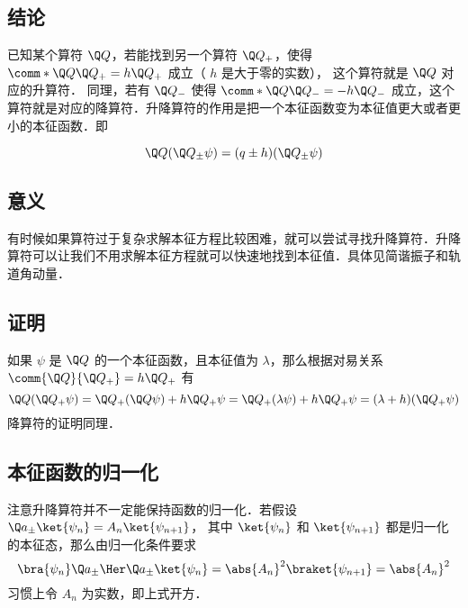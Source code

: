 


\subsection{结论}

已知某个算符 $\Q Q$，若能找到另一个算符 $\Q Q_+$，使得 $\comm*{\Q Q}{\Q Q_+} = h \Q Q_+$ 成立（ $h$ 是大于零的实数）， 这个算符就是 $\Q Q$ 对应的升算符． 同理，若有 $\Q Q_-$ 使得 $\comm*{\Q Q}{\Q Q_-} = - h\Q Q_-$ 成立，这个算符就是对应的降算符．升降算符的作用是把一个本征函数变为本征值更大或者更小的本征函数．即

\begin{equation}\label{RLop_eq1}
\Q Q(\Q Q_\pm\psi) = (q \pm h) (\Q Q_ \pm\psi)
\end{equation}

\subsection{意义}
有时候如果算符过于复杂求解本征方程比较困难，就可以尝试寻找升降算符．升降算符可以让我们不用求解本征方程就可以快速地找到本征值．具体见简谐振子和轨道角动量．%

\subsection{证明}
如果 $\psi$ 是 $\Q Q$ 的一个本征函数，且本征值为 $\lambda$，那么根据对易关系 $\comm{\Q Q}{\Q Q_+} = h \Q Q_+$ 有
\begin{equation}
\Q Q (\Q Q_+ \psi) = \Q Q_+ (\Q Q\psi) + h \Q Q_+ \psi  = \Q Q_+ (\lambda \psi) + h \Q Q_+ \psi  = (\lambda  + h)(\Q Q_+ \psi)
\end{equation}
降算符的证明同理．

\subsection{本征函数的归一化}
注意升降算符并不一定能保持函数的归一化．若假设 $\Q a_\pm \ket{\psi_n} = A_n \ket{\psi_{n+1}}$， 其中 $\ket{\psi_n}$ 和 $\ket{\psi_{n + 1}}$ 都是归一化的本征态，那么由归一化条件要求
\begin{equation}
\bra{\psi_n} \Q a_\pm\Her \Q a_\pm \ket{\psi_n} = \abs{A_n}^2 \braket{\psi_{n+1}} = \abs{A_n}^2
\end{equation}
习惯上令 $A_n$ 为实数，即上式开方． 
